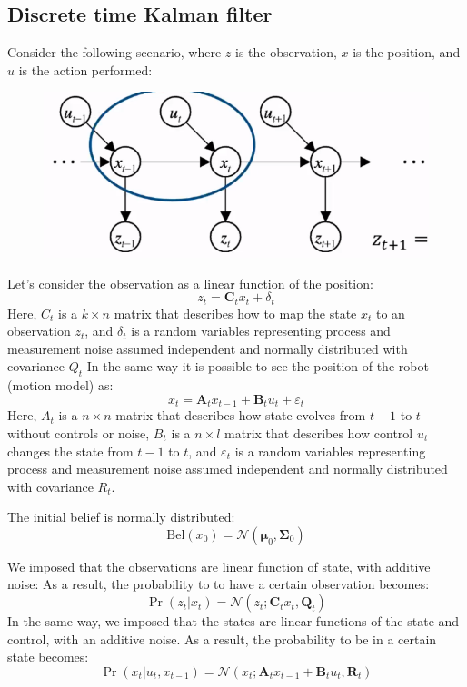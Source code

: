 \subsection{Discrete time Kalman filter}
Consider the following scenario, where $z$ is the observation, $x$ is the position, and $u$ is the action performed: 
\begin{figure}[H]
    \centering
    \includegraphics[width=0.75\linewidth]{images/kal.png}
\end{figure}
Let's consider the observation as a linear function of the position: 
\[z_t=\mathbf{C}_tx_t+\delta_t\]
Here, $C_t$ is a $k\times n$ matrix that describes how to map the state $x_t$ to an observation $z_t$, and $\delta_t$ is a random variables representing process and measurement noise assumed independent and normally distributed with covariance $Q_t$
In the same way it is possible to see the position of the robot (motion model) as: 
\[x_t=\mathbf{A}_tx_{t-1}+\mathbf{B}_tu_t+\varepsilon_t\]
Here, $A_t$ is a $n\times n$ matrix that describes how state evolves from $t-1$ to $t$ without controls or noise, $B_t$ is a $n\times l$ matrix that describes how control $u_t$ changes the state from $t-1$ to $t$, and $\varepsilon_t$ is a random variables representing process and measurement noise assumed independent and normally distributed with covariance $R_t$. 

The initial belief is normally distributed: 
\[\text{Bel}(x_0)=\mathcal{N}(\boldsymbol{\mu}_0,\mathbf{\Sigma}_0)\]

We imposed that the observations are linear function of state, with additive noise:
As a result, the probability to to have a certain observation becomes: 
\[\Pr(z_t|x_t)=\mathcal{N}(z_t;\mathbf{C}_tx_t,\mathbf{Q}_t)\]
In the same way, we imposed that the states are linear functions of the state and control, with an additive noise. 
As a result, the probability to be in a certain state becomes: 
\[\Pr(x_t|u_t,x_{t-1})=\mathcal{N}(x_t;\mathbf{A}_tx_{t-1}+\mathbf{B}_tu_t,\mathbf{R}_t)\]

